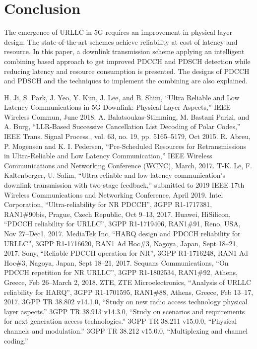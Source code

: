 \documentclass[conference,10pt]{IEEEtran}
\begin{document}
\section{Conclusion}

The emergence of URLLC in 5G requires an improvement in physical layer design. The state-of-the-art schemes achieve reliability at cost of latency and resource. In this paper, a downlink transmission scheme applying an intelligent combining based approach to get improved PDCCH and PDSCH detection while reducing latency and resource consumption is presented. The designs of PDCCH and PDSCH and the techniques to implement the combining are also explained. 

\begin{thebibliography}{00}
 H. Ji, S. Park, J. Yeo, Y. Kim, J. Lee, and B. Shim, ``Ultra Reliable and Low Latency Communications in 5G Downlink: Physical Layer Aspects,''  IEEE Wireless Commun, June 2018.
 A. Balatsoukas-Stimming, M. Bastani Parizi, and A. Burg, ``LLR-Based Successive Cancellation List Decoding of Polar Codes,'' IEEE Trans. Signal Process., vol. 63, no. 19, pp. 5165–5179, Oct 2015.
 R. Abreu, P. Mogensen and K. I. Pedersen, ``Pre-Scheduled Resources for Retransmissions in Ultra-Reliable and Low Latency Communication,'' IEEE Wireless Communications and Networking Conference (WCNC), March, 2017.
 T-K. Le, F. Kaltenberger, U. Salim, ``Ultra-reliable and low-latency communication's downlink transmission with two-stage feedback,'' submitted to 2019 IEEE 17th Wireless Communications and Networking Conference, April 2019.
 Intel Corporation, ``Ultra-reliability for NR PDCCH'', 3GPP R1-1717381, RAN1\#90bis, Prague, Czech Republic, Oct 9--13, 2017.
 Huawei, HiSilicon, ``PDCCH reliability for URLLC'', 3GPP R1-1719406, RAN1\#91, Reno, USA, Nov 27--Dec1, 2017.
 MediaTek Inc, ``HARQ design and PDCCH reliability for URLLC'', 3GPP R1-1716620, RAN1 Ad Hoc\#3, Nagoya, Japan, Sept 18--21, 2017.
 Sony, ``Reliable PDCCH operation for NR'', 3GPP R1-1716248, RAN1 Ad Hoc\#3, Nagoya, Japan, Sept 18--21, 2017.
 Sequans Communications, ``On PDCCH repetition for NR URLLC'', 3GPP R1-1802534, RAN1\#92, Athens, Greece, Feb 26--March 2, 2018.
 ZTE, ZTE Microelectronics, ``Analysis of URLLC reliability for HARQ'', 3GPP R1-1701595, RAN1\#88, Athens, Greece, Feb 13--17, 2017.
 3GPP TR 38.802 v14.1.0, ``Study on new radio access technology physical layer aspects.''
 3GPP TR 38.913 v14.3.0, ``Study on scenarios and requirements for next generation access technologies.''
 3GPP TR 38.211 v15.0.0, ``Physical channels and modulation.''
 3GPP TR 38.212 v15.0.0, ``Multiplexing and channel coding.''

\end{thebibliography}
\vspace{12pt}
\end{document}
